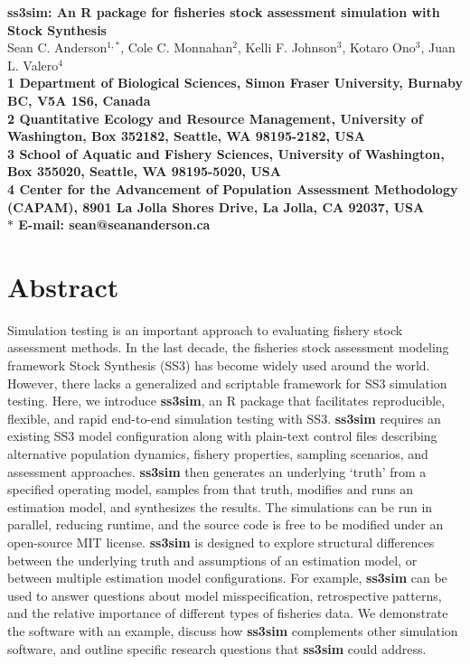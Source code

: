 \documentclass[10pt]{article}
\date{}
\newcommand{\R}[1]{\label{#1}\linelabel{#1}}
\begin{document}
\begin{flushleft}
{\Large
\textbf{ss3sim: An \textsf{R} package for fisheries stock assessment simulation with Stock Synthesis}
}
\\
Sean C. Anderson$^{1,\ast}$,
Cole C. Monnahan$^{2}$,
Kelli F. Johnson$^{3}$,
Kotaro Ono$^{3}$,
Juan L. Valero$^{4}$
\\
\bf{1} Department of Biological Sciences,
Simon Fraser University,
Burnaby BC, V5A 1S6, Canada
\\
\bf{2} Quantitative Ecology and Resource Management,
University of Washington, Box 352182,
Seattle, WA 98195-2182, USA
\\
\bf{3} School of Aquatic and Fishery Sciences,
University of Washington, Box 355020,
Seattle, WA 98195-5020, USA
\\
\bf{4} Center for the Advancement of Population Assessment Methodology
(CAPAM), 8901 La Jolla Shores Drive, La Jolla, CA 92037, USA
\\
$\ast$ E-mail: sean@seananderson.ca
\end{flushleft}


\linenumbers
\modulolinenumbers[1]

%
\section*{Abstract}

Simulation testing is an important approach to evaluating fishery stock
assessment methods. In the last decade, the fisheries stock assessment modeling
framework Stock Synthesis (SS3) has become widely used around the world.
However, there lacks a generalized and scriptable framework for SS3 simulation
testing. Here, we introduce \textbf{ss3sim}, an \textsf{R} package that
facilitates \R{B3:2}reproducible, flexible, and rapid end-to-end simulation
testing with SS3. \textbf{ss3sim} requires an existing SS3 model configuration
along with plain-text control files describing alternative population dynamics,
fishery properties, sampling scenarios, and assessment approaches.
\textbf{ss3sim} then generates an underlying `truth' \R{B4}from a specified
operating model, samples from that truth, modifies and runs an estimation
model, and synthesizes the results. The simulations can be run in parallel,
\R{B16:2}reducing runtime, and the source code is free to be modified under an
open-source MIT license. \textbf{ss3sim} is designed to explore structural
differences between the underlying truth and assumptions of an estimation
model, or between multiple estimation model configurations. For example,
\textbf{ss3sim} can be used to answer questions about model misspecification,
retrospective patterns, and the relative importance of different types of
fisheries data. We demonstrate the software with an example, discuss how
\textbf{ss3sim} complements other simulation software, and outline specific
research questions that \textbf{ss3sim} could address.
\end{document}
